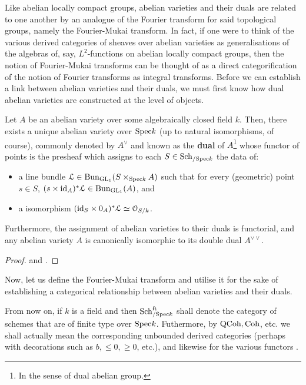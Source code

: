     Like abelian locally compact groups, abelian varieties and their duals are related to one another by an analogue of the Fourier transform for said topological groups, namely the Fourier-Mukai transform. In fact, if one were to think of the various derived categories of sheaves over abelian varieties as generalisations of the algebras of, say, $L^2$-functions on abelian locally compact groups, then the notion of Fourier-Mukai transforms can be thought of as a direct categorification of the notion of Fourier transforms as integral transforms. Before we can establish a link between abelian varieties and their duals, we must first know how dual abelian varieties are constructed at the level of objects. 
    \begin{proposition} \label{prop: dual_abelian_varieties}
        Let $A$ be an abelian variety over some algebraically closed field $k$. Then, there exists a unique abelian variety over $\mathrm{Spec} k$ (up to natural isomorphisms, of course), commonly denoted by $A^{\vee}$ and known as the \textbf{dual} of $A$\footnote{In the sense of dual abelian group.} whose functor of points is the presheaf which assigns to each $S \in \mathrm{Sch}_{/\mathrm{Spec} k}$ the data of:
            \begin{itemize}
                \item a line bundle $\calL \in \Bun_{\GL_1}(S \x_{\Spec k} A)$ such that for every (geometric) point $s \in S$, $(s \x \id_A)^*\calL \in \Bun_{\GL_1}(A)$, and
                \item a  isomorphism $(\id_S \x 0_A)^*\calL \cong \calO_{S/k}$.
            \end{itemize}
        Furthermore, the assignment of abelian varieties to their duals is functorial, and any abelian variety $A$ is canonically isomorphic to its double dual $A^{\vee \vee}$.
    \end{proposition}
        \begin{proof}
            \cite[Sections 8 and 13]{mumford_1970_abelian_varieties} and \cite[Subsection 15.2 and Theorem 16.2]{bhatt_abelian_varieties}.
        \end{proof}
    Now, let us define the Fourier-Mukai transform and utilise it for the sake of establishing a categorical relationship between abelian varieties and their duals.
    \begin{convention}
        From now on, if $k$ is a field and then $\mathrm{Sch}_{/\mathrm{Spec} k}^{\mathrm{ft}}$ shall denote the category of schemes that are of finite type over $\mathrm{Spec} k$. Futhermore, by $\mathrm{QCoh}, \mathrm{Coh}$, etc. we shall actually mean the corresponding unbounded derived categories (perhaps with decorations such as $b, \leq 0, \geq 0$, etc.), and likewise for the various functors .
    \end{convention}
